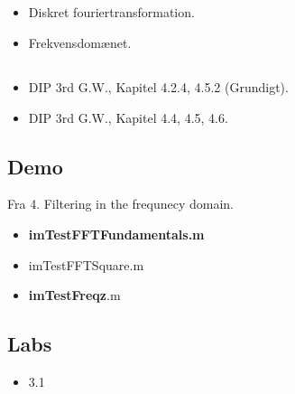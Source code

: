 \subsection{\subtopics}

\begin{itemize}
	\item Diskret fouriertransformation.
	\item Frekvensdomænet.
\end{itemize}

\subsection{\curriculum}

\begin{itemize}
	\item DIP 3rd G.W., Kapitel 4.2.4, 4.5.2 (Grundigt).
	\item DIP 3rd G.W., Kapitel 4.4, 4.5, 4.6.
\end{itemize}

\subsection{Demo}

Fra 4. Filtering in the frequnecy domain.

\begin{itemize}
	\item \textbf{imTestFFTFundamentals.m}
	\item imTestFFTSquare.m
	\item \textbf{imTestFreqz}.m
\end{itemize}

\subsection{Labs}

\begin{itemize}
	\item 3.1
\end{itemize}
